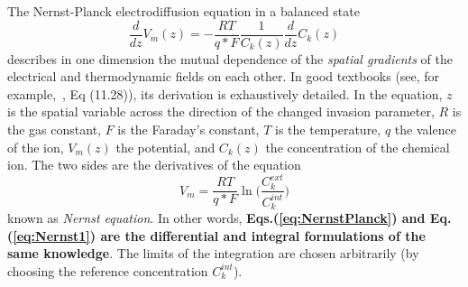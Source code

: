 {
The Nernst-Planck electrodiffusion equation in a balanced state
\begin{equation}
	\frac{d}{dz}V_{m}(z)=-\frac{RT}{q*F}\frac{1}{C_{k}(z)}\frac{d}{dz}C_{k}(z)\label{eq:NernstPlanck}
\end{equation}
describes in one dimension the mutual dependence of the \emph{spatial gradients} of the
electrical and thermodynamic fields on each other. In good textbooks (see, for example,~\cite{KochBiophysics:1999},
Eq (11.28)), its derivation is exhaustively detailed. In the
equation, $z$ is the spatial variable across the direction of the
changed invasion parameter, $R$ is the gas constant, $F$ is the
Faraday's constant, $T$ is the temperature, $q$ the valence
of the ion, ${V_m(z)}$ the potential, and ${C_k(z)}$ the concentration
of the chemical ion. The two sides are the derivatives of the equation
\begin{equation}
	V_{m} =\frac{RT}{q*F}\ln{\biggl(\frac{C_{k}^{ext}}{C_{k}^{int}}\biggr)}\label{eq:Nernst1}
\end{equation}
\noindent known as \textit{Nernst equation}.  In other words, \textbf{Eqs.(\ref{eq:NernstPlanck}) and Eq.(\ref{eq:Nernst1}) are the differential and integral formulations of the same knowledge}. The limits of the integration are chosen arbitrarily (by choosing the reference concentration $C_{k}^{int}$).
}





